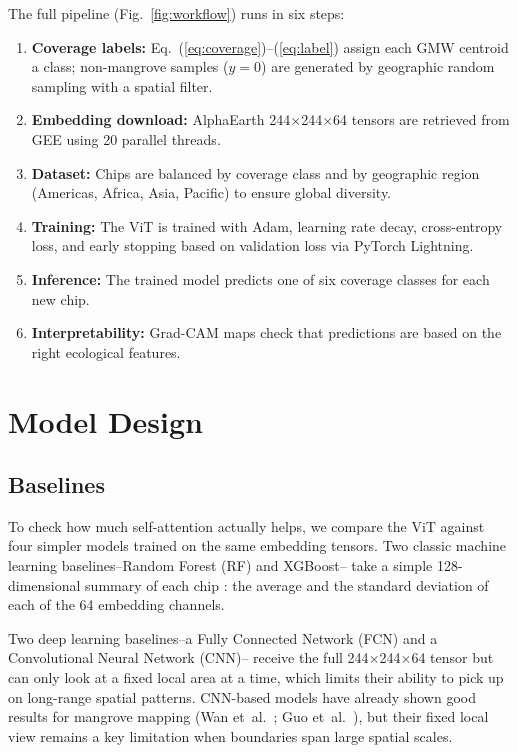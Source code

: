 \documentclass[conference,a4paper]{IEEEtran}
\begin{document}
The full pipeline (Fig.~\ref{fig:workflow}) runs in six steps:
\begin{enumerate}
\item \textbf{Coverage labels:} Eq.~(\ref{eq:coverage})--(\ref{eq:label}) assign each GMW centroid a class; non-mangrove samples ($y=0$) are generated by geographic random sampling with a spatial filter.
\item \textbf{Embedding download:} AlphaEarth 244$\times$244$\times$64 tensors are retrieved from GEE using 20 parallel threads.
\item \textbf{Dataset:} Chips are balanced by coverage class and by geographic region (Americas, Africa, Asia, Pacific) to ensure global diversity.
\item \textbf{Training:} The ViT is trained with Adam, learning rate decay, cross-entropy loss, and early stopping based on validation loss via PyTorch Lightning.
\item \textbf{Inference:} The trained model predicts one of six coverage classes for each new chip.
\item \textbf{Interpretability:} Grad-CAM maps check that predictions are based on the right ecological features.
\end{enumerate}

\section{Model Design}

\subsection{Baselines}

To check how much self-attention actually helps, 
we compare the ViT against four simpler models trained on the same embedding tensors. Two classic machine learning baselines--Random Forest (RF) and XGBoost--
take a simple 128-dimensional summary of each chip : the average and the standard deviation of each of the 64 embedding channels. 

Two deep learning baselines--a Fully Connected Network (FCN) and a Convolutional Neural Network (CNN)--
receive the full 244$\times$244$\times$64 tensor but can only look at a fixed local area at a time, which limits their ability to pick up on long-range spatial patterns.
CNN-based models have already shown good results for mangrove mapping (Wan et~al.~\cite{article11}; Guo et~al.~\cite{article17}), but their fixed local view remains a key limitation when boundaries span large spatial scales.
\end{document}
